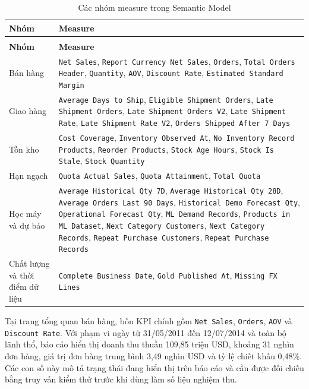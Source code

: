 \begingroup
\small
\renewcommand{\arraystretch}{1.08}
\begin{longtable}{|>{\raggedright\arraybackslash}p{3.3cm}|>{\raggedright\arraybackslash}p{11.1cm}|}
\caption{Các nhóm measure trong Semantic Model}\label{tab:semantic-measures}\\ \hline
\textbf{Nhóm} & \textbf{Measure} \\ \hline
\endfirsthead
\multicolumn{2}{c}{\textit{Bảng~\ref{tab:semantic-measures} (tiếp theo)}}\\ \hline
\textbf{Nhóm} & \textbf{Measure} \\ \hline
\endhead
Bán hàng & \texttt{Net Sales}, \texttt{Report Currency Net Sales}, \texttt{Orders}, \texttt{Total Orders Header}, \texttt{Quantity}, \texttt{AOV}, \texttt{Discount Rate}, \texttt{Estimated Standard Margin} \\ \hline
Giao hàng & \texttt{Average Days to Ship}, \texttt{Eligible Shipment Orders}, \texttt{Late Shipment Orders}, \texttt{Late Shipment Orders V2}, \texttt{Late Shipment Rate}, \texttt{Late Shipment Rate V2}, \texttt{Orders Shipped After 7 Days} \\ \hline
Tồn kho & \texttt{Cost Coverage}, \texttt{Inventory Observed At}, \texttt{No Inventory Record Products}, \texttt{Reorder Products}, \texttt{Stock Age Hours}, \texttt{Stock Is Stale}, \texttt{Stock Quantity} \\ \hline
Hạn ngạch & \texttt{Quota Actual Sales}, \texttt{Quota Attainment}, \texttt{Total Quota} \\ \hline
Học máy và dự báo & \texttt{Average Historical Qty 7D}, \texttt{Average Historical Qty 28D}, \texttt{Average Orders Last 90 Days}, \texttt{Historical Demo Forecast Qty}, \texttt{Operational Forecast Qty}, \texttt{ML Demand Records}, \texttt{Products in ML Dataset}, \texttt{Next Category Customers}, \texttt{Next Category Records}, \texttt{Repeat Purchase Customers}, \texttt{Repeat Purchase Records} \\ \hline
Chất lượng và thời điểm dữ liệu & \texttt{Complete Business Date}, \texttt{Gold Published At}, \texttt{Missing FX Lines} \\ \hline
\end{longtable}
\endgroup

Tại trang tổng quan bán hàng, bốn KPI chính gồm \texttt{Net Sales}, \texttt{Orders}, \texttt{AOV} và \texttt{Discount Rate}. Với phạm vi ngày từ 31/05/2011 đến 12/07/2014 và toàn bộ lãnh thổ, báo cáo hiển thị doanh thu thuần 109,85 triệu USD, khoảng 31 nghìn đơn hàng, giá trị đơn hàng trung bình 3,49 nghìn USD và tỷ lệ chiết khấu 0,48\%. Các con số này mô tả trạng thái đang hiển thị trên báo cáo và cần được đối chiếu bằng truy vấn kiểm thử trước khi dùng làm số liệu nghiệm thu.

